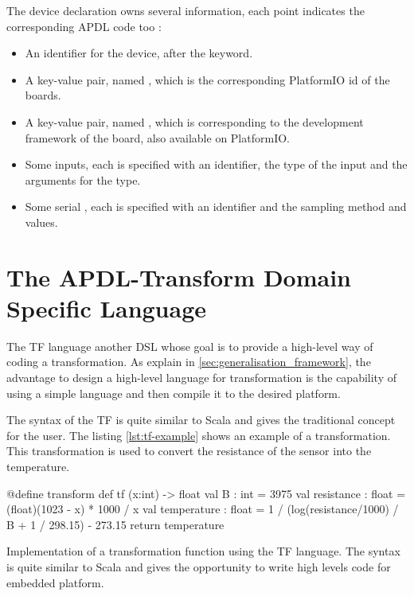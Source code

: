 The device declaration owns several information, each point indicates the
corresponding APDL code too :
\begin{itemize}
\item An identifier for the device, after the  keyword.
\item A key-value pair, named , which is the corresponding
  PlatformIO id of the boards\cite{Ivan2017}.
\item A key-value pair, named , which is corresponding to
  the development framework of the board, also available on PlatformIO\cite{Ivan2017}.
\item Some inputs, each is specified with an identifier, the type of the input
  and the arguments for the type.
\item Some serial , each is specified with an identifier and the sampling method
  and values.
\end{itemize}

\section{The APDL-Transform Domain Specific Language}
\label{sec:transformation_dsl}

The \gls{TF} language another \gls{DSL} whose goal is to provide a high-level way of
coding a transformation. As explain in \ref{sec:generalisation_framework}, the
advantage to design a high-level language for transformation is the capability
of using a simple language and then compile it to the desired platform.

The syntax of the \gls{TF} is quite similar to Scala and gives the traditional
concept for the user. The listing \ref{lst:tf-example} shows an example of a
transformation. This transformation is used to convert the resistance of the
sensor into the temperature.

\begin{listing}[H]
  \centering
\begin{apdlcode}
@define transform def tf (x:int) -> float {
    val B : int = 3975
    val resistance : float = (float)(1023 - x) * 1000 / x
    val temperature : float = 1 / (log(resistance/1000) / B + 1 / 298.15) - 273.15
    return temperature
}
\end{apdlcode}
  \caption[APDL transformation implement with the \gls{TF}
  language]{Implementation of a transformation function using the \gls{TF}
    language. The syntax is quite similar to Scala and gives the opportunity to
    write high levels code for embedded platform.}
  \label{lst:tf-example}
\end{listing}

